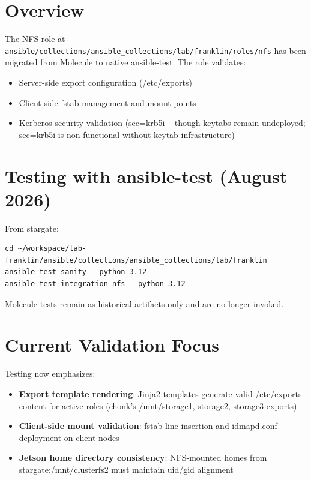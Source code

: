 
\section{Overview}

The NFS role at \texttt{ansible/collections/ansible\_collections/lab/franklin/roles/nfs} has been migrated from Molecule to native ansible-test. The role validates:

\begin{itemize}
    \item Server-side export configuration (/etc/exports)
    \item Client-side fstab management and mount points
    \item Kerberos security validation (sec=krb5i -- though keytabs remain undeployed; sec=krb5i is non-functional without keytab infrastructure)
\end{itemize}

\section{Testing with ansible-test (August 2026)}

From stargate:
\begin{verbatim}
cd ~/workspace/lab-franklin/ansible/collections/ansible_collections/lab/franklin
ansible-test sanity --python 3.12
ansible-test integration nfs --python 3.12
    \end{verbatim}

Molecule tests remain as historical artifacts only and are no longer invoked.

\section{Current Validation Focus}

Testing now emphasizes:

\begin{itemize}
    \item \textbf{Export template rendering}: Jinja2 templates generate valid /etc/exports content for active roles (chonk's /mnt/storage1, storage2, storage3 exports)
    
    \item \textbf{Client-side mount validation}: fstab line insertion and idmapd.conf deployment on client nodes
    
    \item \textbf{Jetson home directory consistency}: NFS-mounted homes from stargate:/mnt/clusterfs2 must maintain uid/gid alignment
\end{itemize}

